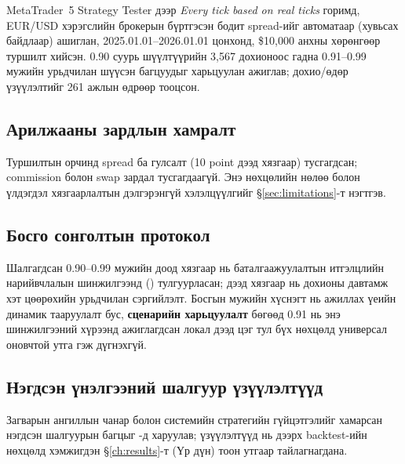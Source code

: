 MetaTrader~5 Strategy Tester дээр \emph{Every tick based on real ticks} горимд, EUR/USD хэрэгслийн брокерын бүртгэсэн бодит spread-ийг автоматаар (хувьсах байдлаар) ашиглан, 2025.01.01--2026.01.01 цонхонд, \$10{,}000 анхны хөрөнгөөр туршилт хийсэн. 0.90 суурь шүүлтүүрийн 3,567 дохионоос гадна 0.91--0.99 мужийн урьдчилан шүүсэн багцуудыг харьцуулан ажиглав; дохио/өдөр үзүүлэлтийг 261 ажлын өдрөөр тооцсон.

\subsection{Арилжааны зардлын хамралт}

Туршилтын орчинд spread ба гулсалт (10 point дээд хязгаар) тусгагдсан; commission болон swap зардал тусгагдаагүй. Энэ нөхцөлийн нөлөө болон үлдэгдэл хязгаарлалтын дэлгэрэнгүй хэлэлцүүлгийг §\ref{sec:limitations}-т нэгтгэв.

\subsection{Босго сонголтын протокол}

Шалгагдсан 0.90--0.99 мужийн доод хязгаар нь баталгаажуулалтын итгэлцлийн нарийвчлалын шинжилгээнд () тулгуурласан; дээд хязгаар нь дохионы давтамж хэт цөөрөхийн урьдчилан сэргийлэлт. Босгын мужийн хүснэгт нь ажиллах үеийн динамик тааруулалт бус, \textbf{сценарийн харьцуулалт} бөгөөд 0.91 нь энэ шинжилгээний хүрээнд ажиглагдсан локал дээд цэг тул бүх нөхцөлд универсал оновчтой утга гэж дүгнэхгүй.

\subsection{Нэгдсэн үнэлгээний шалгуур үзүүлэлтүүд}

Загварын ангиллын чанар болон системийн стратегийн гүйцэтгэлийг хамарсан нэгдсэн шалгуурын багцыг -д харуулав; үзүүлэлтүүд нь дээрх backtest-ийн нөхцөлд хэмжигдэн §\ref{ch:results}-т (Үр дүн) тоон утгаар тайлагнагдана.

